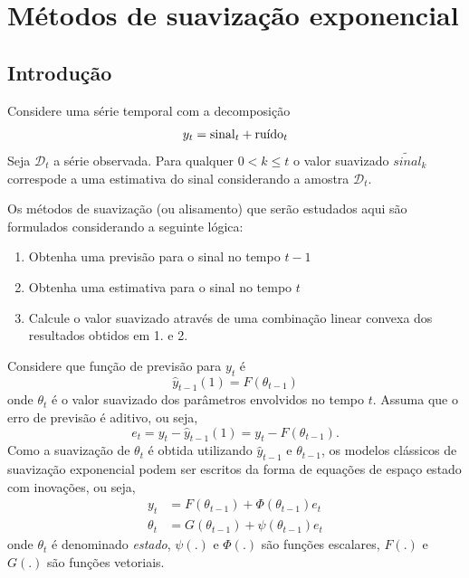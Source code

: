 \documentclass[
  letterpaper,
  DIV=11,
  numbers=noendperiod]{scrartcl}
\providecommand{\tightlist}{%
  \setlength{\itemsep}{0pt}\setlength{\parskip}{0pt}}\usepackage{longtable,booktabs,array}
\theoremstyle{plain}
\theoremstyle{plain}
\theoremstyle{definition}
\theoremstyle{definition}
\theoremstyle{remark}
\begin{document}

\hypertarget{muxe9todos-de-suavizauxe7uxe3o-exponencial}{%
\chapter{Métodos de suavização
exponencial}\label{muxe9todos-de-suavizauxe7uxe3o-exponencial}}

\hypertarget{introduuxe7uxe3o-1}{%
\section{Introdução}\label{introduuxe7uxe3o-1}}

Considere uma série temporal com a decomposição
\[y_t=\hbox{sinal}_t+\hbox{ruído}_t\] Seja \(\mathcal{D}_t\) a série
observada. Para qualquer \(0<k\leq t\) o valor suavizado
\(\tilde{sinal}_k\) correspode a uma estimativa do sinal considerando a
amostra \(\mathcal{D}_t\).

Os métodos de suavização (ou alisamento) que serão estudados aqui são
formulados considerando a seguinte lógica:

\begin{enumerate}
\def\labelenumi{\arabic{enumi}.}
\tightlist
\item
  Obtenha uma previsão para o sinal no tempo \(t-1\)
\item
  Obtenha uma estimativa para o sinal no tempo \(t\)
\item
  Calcule o valor suavizado através de uma combinação linear convexa dos
  resultados obtidos em 1. e 2.
\end{enumerate}

Considere que função de previsão para \(y_t\) é
\[\hat{y}_{t-1}(1)=F(\theta_{t-1})\] onde \(\theta_t\) é o valor
suavizado dos parâmetros envolvidos no tempo \(t\). Assuma que o erro de
previsão é aditivo, ou seja,
\[e_t=y_t-\hat{y}_{t-1}(1)=y_t-F(\theta_{t-1}).\] Como a suavização de
\(\theta_t\) é obtida utilizando \(\hat{y}_{t-1}\) e \(\theta_{t-1}\),
os modelos clássicos de suavização exponencial podem ser escritos da
forma de equações de espaço estado com inovações, ou seja,
\[\begin{align}y_t&=F(\theta_{t-1})+\Phi(\theta_{t-1}) e_t\\
\theta_t&= G(\theta_{t-1})+\psi(\theta_{t-1})e_t
\end{align}\] onde \(\theta_t\) é denominado \emph{estado}, \(\psi(.)\)
e \(\Phi(.)\) são funções escalares, \(F(.)\) e \(G(.)\) são funções
vetoriais.
\end{document}
